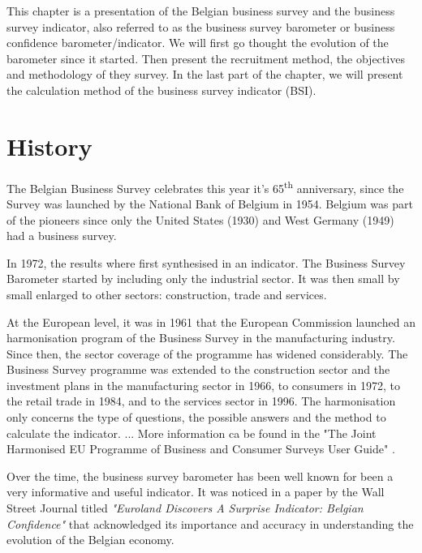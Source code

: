 \documentclass[12pt,a4paper,oneside]{book}
\begin{document}
This chapter is a presentation of the Belgian business survey and the business survey indicator, also referred to as the business survey barometer or business confidence barometer/indicator.
We will first go thought the evolution of the barometer since it started. Then present the recruitment method, the objectives and methodology of they survey. 
In the last part of the chapter, we will present the calculation method of the business survey indicator (BSI).

\section{History}

The Belgian Business Survey celebrates this year it's 65\textsuperscript{th} anniversary, since the Survey was launched by the National Bank of Belgium in 1954. 
Belgium was part of the pioneers since only the United States (1930) and West Germany (1949) had a business survey.

In 1972, the results where first synthesised in an indicator.
The Business Survey Barometer started by including only the industrial sector. It was then small by small enlarged to other sectors: construction, trade and services. %

At the European level, it was in 1961 that the European Commission launched an harmonisation program of the Business Survey in the manufacturing industry. 
Since then, the sector coverage of the programme has widened considerably. The Business Survey programme was extended to the construction sector and the investment plans in the manufacturing sector in 1966, to consumers in 1972, to the retail trade in 1984, and to the services sector in 1996.
The harmonisation only concerns the type of questions, the possible answers and the method to calculate the indicator. ...
More information ca be found in the "The Joint Harmonised EU Programme of Business and Consumer Surveys User Guide" \cite{european_commission_joint_2016}.

Over the time, the business survey barometer has been well known for been a very informative and useful indicator. 
It was noticed in a paper by the Wall Street Journal titled \textit{"Euroland Discovers A Surprise Indicator: Belgian Confidence"} \citep{rhoads_euroland_1999} that acknowledged its importance and accuracy in understanding the evolution of the Belgian economy.

\end{document}
